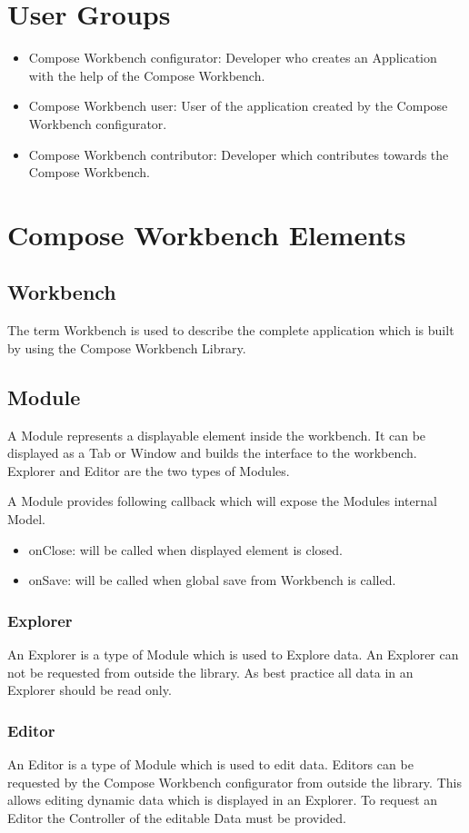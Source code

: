 \section{User Groups}
\begin{itemize}
\item Compose Workbench configurator: Developer who creates an Application with the help of the Compose Workbench.
\item Compose Workbench user: User of the application created by the Compose Workbench configurator.
\item Compose Workbench contributor: Developer which contributes towards the Compose Workbench.
\end{itemize}


\section{Compose Workbench Elements}
\subsection{Workbench}
The term Workbench is used to describe the complete application which is built by using the Compose Workbench Library.

\subsection{Module}
A Module represents a displayable element inside the workbench. It can be displayed as a Tab or Window and builds the interface to the workbench. Explorer and Editor are the two types of Modules. 

A Module provides following callback which will expose the Modules internal Model.
\begin{itemize}
    \item onClose: will be called when displayed element is closed.
    \item onSave: will be called when global save from Workbench is called.
\end{itemize}

\subsubsection{Explorer}
An Explorer is a type of Module which is used to Explore data. An Explorer can not be requested from outside the library. As best practice all data in an Explorer should be read only.

\subsubsection{Editor}
An Editor is a type of Module which is used to edit data. Editors can be requested by the Compose Workbench configurator from outside the library. This allows editing dynamic data which is displayed in an Explorer. To request an Editor the Controller of the editable Data must be provided.

